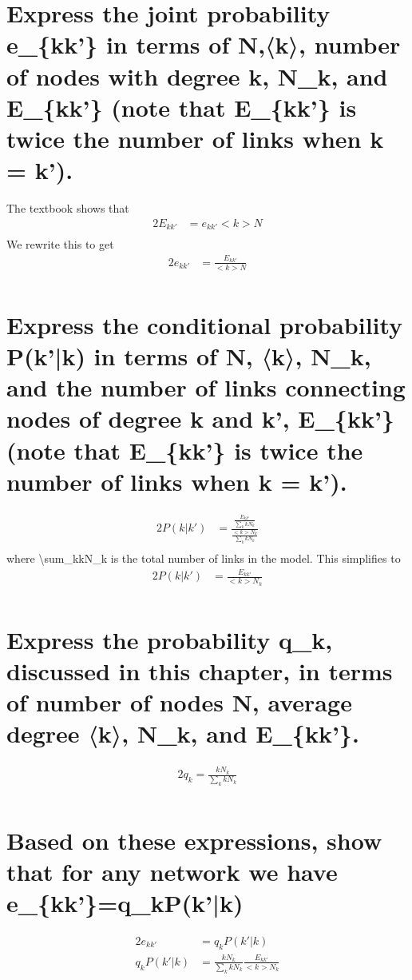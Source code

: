 \documentclass{article}%
\begin{document}
%
\normalsize%
\section{Express the joint probability e\_\{kk'\} in terms of N,〈k〉, number of nodes with degree k, N\_k, and E\_\{kk'\} (note that E\_\{kk'\} is twice the number of links when k = k').}%
\label{sec:ExpressthejointprobabilityekkintermsofN,k,numberofnodeswithdegreek,Nk,andEkk(notethatEkkistwicethenumberoflinkswhenk=k).}%
The textbook shows that%
\begin{alignat*}{2}%
E_{kk'}&=e_{kk'}<k>N\\%
\end{alignat*}%
We rewrite this to get%
\begin{alignat*}{2}%
e_{kk'}&=\frac{E_{kk'}}{<k>N}\\%
\end{alignat*}

%
\section{Express the conditional probability P(k'|k) in terms of N, 〈k〉, N\_k, and the number of links connecting nodes of degree k and k', E\_\{kk'\} (note that E\_\{kk'\} is twice the number of links when k = k').}%
\label{sec:ExpresstheconditionalprobabilityP(k|k)intermsofN,k,Nk,andthenumberoflinksconnectingnodesofdegreekandk,Ekk(notethatEkkistwicethenumberoflinkswhenk=k).}%
\begin{alignat*}{2}%
P(k|k')&=\frac{\frac{E_{kk'}}{\sum_kkN_k}}{\frac{<k>N_k}{\sum_kkN_k}}\\%
\end{alignat*}%
where \textbackslash{}sum\_kkN\_k is the total number of links in the model.%
This simplifies to%
\begin{alignat*}{2}%
P(k|k')&=\frac{E_{kk'}}{<k>N_k}\\%
\end{alignat*}

%
\section{Express the probability q\_k, discussed in this chapter, in terms of number of nodes N, average degree 〈k〉, N\_k, and E\_\{kk'\}.}%
\label{sec:Expresstheprobabilityqk,discussedinthischapter,intermsofnumberofnodesN,averagedegreek,Nk,andEkk.}%
\begin{alignat*}{2}%
q_k=\frac{kN_k}{\sum_kkN_k}\\%
\end{alignat*}

%
\section{Based on these expressions, show that for any network we have e\_\{kk'\}=q\_kP(k'|k)}%
\label{sec:Basedontheseexpressions,showthatforanynetworkwehaveekk=qkP(k|k)}%
\begin{alignat*}{2}%
e_{kk'}&=q_kP(k'|k)\\%
q_kP(k'|k)&=\frac{kN_k}{\sum_kkN_k}\frac{E_{kk'}}{<k>N_k}\\%
\end{alignat*}

%
\end{document}
